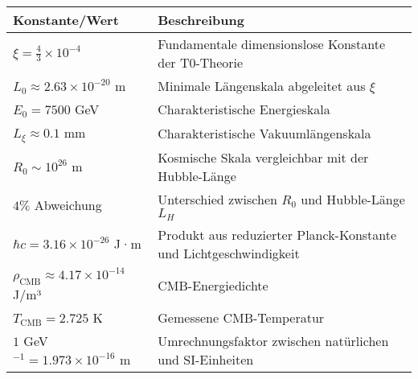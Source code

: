 \documentclass[12pt,a4paper]{article}
\numberwithin{equation}{section}
\begin{document}
	\begin{longtable}{p{4cm} p{10cm}}
		\toprule
		\textbf{Konstante/Wert} & \textbf{Beschreibung} \\
		\midrule
		\endhead
		
		$\xi = \frac{4}{3} \times 10^{-4}$ & Fundamentale dimensionslose Konstante der T0-Theorie \\
		$L_0 \approx 2.63 \times 10^{-20}$ m & Minimale Längenskala abgeleitet aus $\xi$ \\
		$E_0 = 7500$ GeV & Charakteristische Energieskala \\
		$L_\xi \approx 0.1$ mm & Charakteristische Vakuumlängenskala \\
		$R_0 \sim 10^{26}$ m & Kosmische Skala vergleichbar mit der Hubble-Länge \\
		$4\%$ Abweichung & Unterschied zwischen $R_0$ und Hubble-Länge $L_H$ \\
		$\hbar c = 3.16 \times 10^{-26}$ J·m & Produkt aus reduzierter Planck-Konstante und Lichtgeschwindigkeit \\
		$\rho_{\text{CMB}} \approx 4.17 \times 10^{-14}$ J/m³ & CMB-Energiedichte \\
		$T_{\text{CMB}} = 2.725$ K & Gemessene CMB-Temperatur \\
		$1$ GeV$^{-1} = 1.973 \times 10^{-16}$ m & Umrechnungsfaktor zwischen natürlichen und SI-Einheiten \\
		\bottomrule
	\end{longtable}
\end{document}
